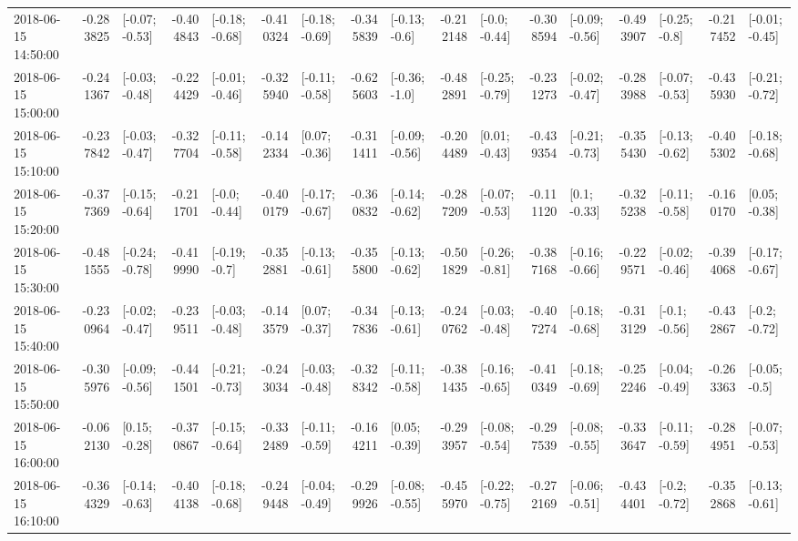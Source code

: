\begin{tabular}{lrlrlrlrlrlrlrlrl}
2018-06-15 14:50:00 & -0.283825 &  [-0.07; -0.53] & -0.404843 &  [-0.18; -0.68] & -0.410324 &  [-0.18; -0.69] & -0.345839 &   [-0.13; -0.6] & -0.212148 &   [-0.0; -0.44] & -0.308594 &  [-0.09; -0.56] & -0.493907 &   [-0.25; -0.8] & -0.217452 &  [-0.01; -0.45] \\
2018-06-15 15:00:00 & -0.241367 &  [-0.03; -0.48] & -0.224429 &  [-0.01; -0.46] & -0.325940 &  [-0.11; -0.58] & -0.625603 &   [-0.36; -1.0] & -0.482891 &  [-0.25; -0.79] & -0.231273 &  [-0.02; -0.47] & -0.283988 &  [-0.07; -0.53] & -0.435930 &  [-0.21; -0.72] \\
2018-06-15 15:10:00 & -0.237842 &  [-0.03; -0.47] & -0.327704 &  [-0.11; -0.58] & -0.142334 &   [0.07; -0.36] & -0.311411 &  [-0.09; -0.56] & -0.204489 &   [0.01; -0.43] & -0.439354 &  [-0.21; -0.73] & -0.355430 &  [-0.13; -0.62] & -0.405302 &  [-0.18; -0.68] \\
2018-06-15 15:20:00 & -0.377369 &  [-0.15; -0.64] & -0.211701 &   [-0.0; -0.44] & -0.400179 &  [-0.17; -0.67] & -0.360832 &  [-0.14; -0.62] & -0.287209 &  [-0.07; -0.53] & -0.111120 &    [0.1; -0.33] & -0.325238 &  [-0.11; -0.58] & -0.160170 &   [0.05; -0.38] \\
2018-06-15 15:30:00 & -0.481555 &  [-0.24; -0.78] & -0.419990 &   [-0.19; -0.7] & -0.352881 &  [-0.13; -0.61] & -0.355800 &  [-0.13; -0.62] & -0.501829 &  [-0.26; -0.81] & -0.387168 &  [-0.16; -0.66] & -0.229571 &  [-0.02; -0.46] & -0.394068 &  [-0.17; -0.67] \\
2018-06-15 15:40:00 & -0.230964 &  [-0.02; -0.47] & -0.239511 &  [-0.03; -0.48] & -0.143579 &   [0.07; -0.37] & -0.347836 &  [-0.13; -0.61] & -0.240762 &  [-0.03; -0.48] & -0.407274 &  [-0.18; -0.68] & -0.313129 &   [-0.1; -0.56] & -0.432867 &   [-0.2; -0.72] \\
2018-06-15 15:50:00 & -0.305976 &  [-0.09; -0.56] & -0.441501 &  [-0.21; -0.73] & -0.243034 &  [-0.03; -0.48] & -0.328342 &  [-0.11; -0.58] & -0.381435 &  [-0.16; -0.65] & -0.410349 &  [-0.18; -0.69] & -0.252246 &  [-0.04; -0.49] & -0.263363 &   [-0.05; -0.5] \\
2018-06-15 16:00:00 & -0.062130 &   [0.15; -0.28] & -0.370867 &  [-0.15; -0.64] & -0.332489 &  [-0.11; -0.59] & -0.164211 &   [0.05; -0.39] & -0.293957 &  [-0.08; -0.54] & -0.297539 &  [-0.08; -0.55] & -0.333647 &  [-0.11; -0.59] & -0.284951 &  [-0.07; -0.53] \\
2018-06-15 16:10:00 & -0.364329 &  [-0.14; -0.63] & -0.404138 &  [-0.18; -0.68] & -0.249448 &  [-0.04; -0.49] & -0.299926 &  [-0.08; -0.55] & -0.455970 &  [-0.22; -0.75] & -0.272169 &  [-0.06; -0.51] & -0.434401 &   [-0.2; -0.72] & -0.352868 &  [-0.13; -0.61] \\

\end{tabular}
